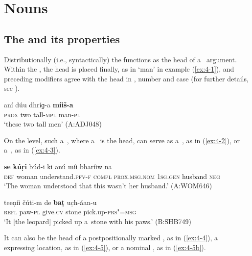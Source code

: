 \chapter{Nouns}
\label{chap:4}

\section{The  and its properties}
\label{sec:4-1}


Distributionally (i.e., syntactically) the  functions as the head of a~  argument. Within the  , the head is placed finally, as in `man' in example (\ref{ex:4-1}), and preceding modifiers agree with the head in , number and case (for further details, see ).


\begin{exe}
\ex
\label{ex:4-1}
\gll aní dúu dhríɡ-a \textbf{míiš-a} \\
	\textsc{prox} two tall-\textsc{mpl} man-\textsc{pl} \\
\glt `these two tall men' (A:ADJ048)
\end{exe}

On the  level, such a~, where a~ is the head, can serve as a~, as in (\ref{ex:4-2}), or a~, as in (\ref{ex:4-3}).

\begin{exe}
\ex
\label{ex:4-2}
\gll \textbf{se} \textbf{kúṛi} búd-i ki anú míi bharíiw na\\
	\textsc{def} woman understand.\textsc{pfv-f} \textsc{compl} \textsc{prox.msg.nom} \textsc{1sg.gen} husband \textsc{neg}\\
\glt `The woman understood that this wasn't her husband.' (A:WOM646)

\ex
\label{ex:4-3}
\gll teeṇíi čúti-m de \textbf{baṭ} uc̣h-áan-u \\
	\textsc{refl} paw-\textsc{pl} give.\textsc{cv} stone pick.up-\textsc{prs"=msg} \\
\glt `It [the leopard] picked up a~stone with his paws.' (B:SHB749)
\end{exe}

It can also be the head of a postpositionally marked  , as in (\ref{ex:4-4}), a   expressing location, as in (\ref{ex:4-5}), or a nominal , as in (\ref{ex:4-5b}).

